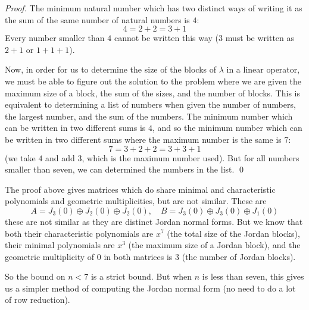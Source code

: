 \begin{proof}

    The minimum natural number which has two distinct ways of writing it as the sum of the same number of natural numbers is $4$:
    \[ 4 = 2 + 2 = 3 + 1 \]
    Every number smaller than $4$ cannot be written this way ($3$ must be written as $2+1$ or $1+1+1$).

    Now, in order for us to determine the size of the blocks of $\lambda$ in a linear operator, we must be able to figure out the solution to the problem where we are given the maximum size of a block,
    the sum of the sizes, and the number of blocks.
    This is equivalent to determining a list of numbers when given the number of numbers, the largest number, and the sum of the numbers.
    The minimum number which can be written in two different sums is $4$, and so the minimum number which can be written in two different sums where the maximum number is the same is $7$:
    \[ 7 = 3 + 2 + 2 = 3 + 3 + 1 \]
    (we take $4$ and add $3$, which is the maximum number used).
    But for all numbers smaller than seven, we can determined the numbers in the list.
    \qed

\end{proof}

The proof above gives matrices which do share minimal and characteristic polynomials and geometric multiplicities, but are not similar.
These are
\[ A = J_3(0)\oplus J_2(0)\oplus J_2(0),\quad B = J_3(0)\oplus J_3(0)\oplus J_1(0) \]
these are not similar as they are distinct Jordan normal forms.
But we know that both their characteristic polynomials are $x^7$ (the total size of the Jordan blocks), their minimal polynomials are $x^3$ (the maximum size of a Jordan block), and the geometric
multiplicity of $0$ in both matrices is $3$ (the number of Jordan blocks).

So the bound on $n<7$ is a strict bound.
But when $n$ is less than seven, this gives us a simpler method of computing the Jordan normal form (no need to do a lot of row reduction).

